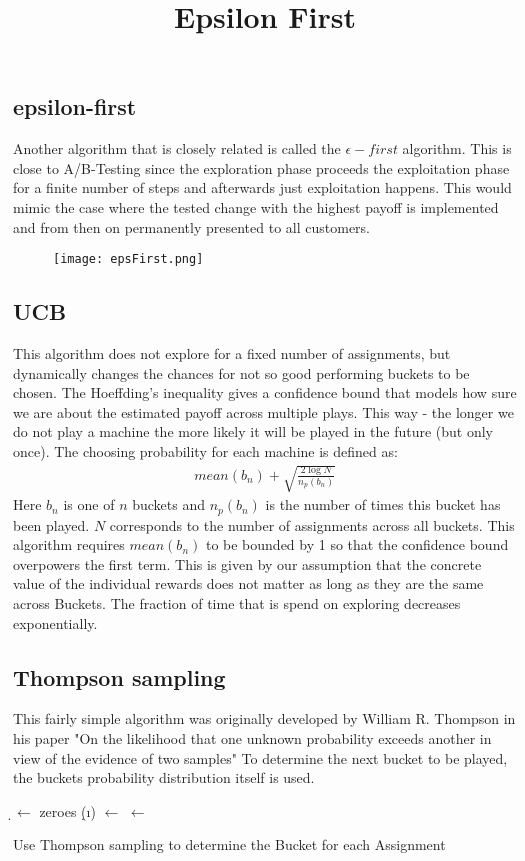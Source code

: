 \documentclass[main.tex]{subfiles}
\begin{document}
\subsection{epsilon-first}
Another algorithm that is closely related is called the $\epsilon-first$ algorithm. This is close to A/B-Testing since the exploration phase proceeds the exploitation phase for a finite number of steps and afterwards just exploitation happens. This would mimic the case where the tested change with the highest payoff is implemented and from then on permanently presented to all customers.
\begin{figure}[ht]
\texttt{[image: epsFirst.png]}
\centering
\title{Epsilon First}
\end{figure}

\subsection{UCB}
This algorithm does not explore for a fixed number of assignments, but dynamically changes the chances for not so good performing buckets to be chosen. The Hoeffding's inequality gives a confidence bound that models how sure we are about the estimated payoff across multiple plays. This way - the longer we do not play a machine the more likely it will be played in the future (but only once). The choosing probability for each machine is defined as:
\begin{align*}
mean(b_n) + \sqrt{\frac{2\log{N}}{n_p(b_n)}}
\end{align*}
Here $b_n$ is one of $n$ buckets and $n_p(b_n)$ is the number of times this bucket has been played. $N$ corresponds to the number of assignments across all buckets. This algorithm requires $mean(b_n)$ to be bounded by 1 so that the confidence bound overpowers the first term. This is given by our assumption that the concrete value of the individual rewards does not matter as long as they are the same across Buckets. The fraction of time that is spend on exploring decreases exponentially.
\

\subsection{Thompson sampling}
This fairly simple algorithm was originally developed by William R. Thompson in his paper "On the likelihood that one unknown probability exceeds another in view of the evidence of two samples" \cite{thompson1933likelihood} To determine the next bucket to be played, the buckets probability distribution itself is used.
\begin{algorithm}
\KwIn{\b}
\KwOut{\na}
\BlankLine
\d $\leftarrow$ zeroes \;
{
\d(\i) $\leftarrow$ \draw{\b{\i}}
}
\na $\leftarrow$ \max{\d} \;

\caption[Thompson Sampling]{Use Thompson sampling to determine the Bucket for each Assignment}
\label{alg:ThompsonSampling}
\end{algorithm}
\end{document}
